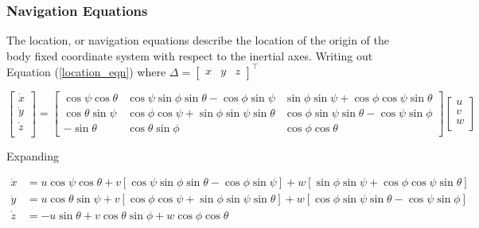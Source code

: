 \subsubsection{Navigation Equations}

The location, or navigation equations describe the location of the origin of the body fixed coordinate system with respect to the inertial axes.
Writing out Equation (\ref{location_eqn}) where $\Delta=\begin{bmatrix} x & y & z \end{bmatrix}^{\top}$

\begin{equation*}
  \begin{bmatrix}
    \dot{x} \\
    \dot{y} \\
    \dot{z} \\
  \end{bmatrix}=
  \begin{bmatrix}
    \cos{\psi}\cos{\theta} & \cos{\psi}\sin{\phi}\sin{\theta}-\cos{\phi}\sin{\psi} & \sin{\phi}\sin{\psi}+\cos{\phi}\cos{\psi}\sin{\theta} \\
    \cos{\theta}\sin{\psi} & \cos{\phi}\cos{\psi}+\sin{\phi}\sin{\psi}\sin{\theta} & \cos{\phi}\sin{\psi}\sin{\theta}-\cos{\psi}\sin{\phi} \\
    -\sin{\theta} & \cos{\theta}\sin{\phi} & \cos{\phi}\cos{\theta}
  \end{bmatrix}
  \begin{bmatrix}
    u \\
    v \\
    w \\
  \end{bmatrix}
\end{equation*}

Expanding

\begin{equation}
  \label{ssposition_eqn}
  \begin{split}
    \dot{x}&=u\cos{\psi}\cos{\theta}+v[\cos{\psi}\sin{\phi}\sin{\theta}-\cos{\phi}\sin{\psi}]+
    w[\sin{\phi}\sin{\psi}+\cos{\phi}\cos{\psi}\sin{\theta}] \\
    \dot{y}&=u\cos{\theta}\sin{\psi}+
    v[\cos{\phi}\cos{\psi}+\sin{\phi}\sin{\psi}\sin{\theta}]+
    w[\cos{\phi}\sin{\psi}\sin{\theta}-\cos{\psi}\sin{\phi}] \\
    \dot{z}&=-u\sin{\theta}+v\cos{\theta}\sin{\phi}+w\cos{\phi}\cos{\theta}
  \end{split}
\end{equation}

